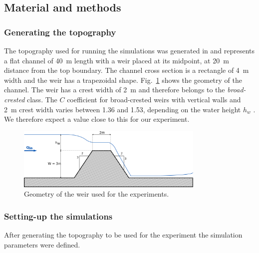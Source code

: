 \subsection{Material and methods}
\subsubsection{Generating the topography}
The topography used for running the simulations was generated in  and represents a flat channel of \SI{40}{\meter} length with a weir placed at its midpoint, at \SI{20}{\meter} distance from the top boundary.
The channel cross section is a rectangle of \SI{4}{\meter} width and the weir has a trapezoidal shape.
Fig.~\ref{fig:weir_scheme} shows the geometry of the channel.
The weir has a crest width of \SI{2}{\meter} and therefore belongs to the \emph{broad-crested} class. The $C$ coefficient for broad-crested weirs with vertical walls and \SI{2}{\meter} crest width varies between \num{1.36} and \num{1.53}, depending on the water height $h_w$ \autocite{brown_urban_2009}.
We therefore expect a value close to this for our experiment.

\begin{figure}[h]
  \centering
  \includegraphics[width=0.8\textwidth]{Figures/weir_scheme.png}
  \caption{Geometry of the weir used for the experiments.}
  \label{fig:weir_scheme}
\end{figure}

\subsubsection{Setting-up the simulations}
After generating the topography to be used for the experiment the simulation parameters were defined.

